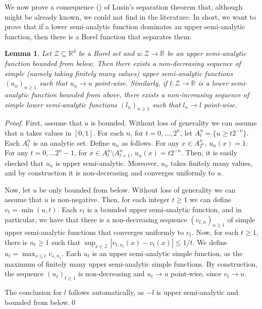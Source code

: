 \documentclass[3p, authoryear, 10pt]{elsarticle}%
\newcommand{\R}{\mathbb R}
\newcommand{\Z}{\mathcal Z}
\newtheorem{lemma}{Lemma}
\begin{document}
We now prove a consequence () of Lusin's separation theorem that, although might be already known, we could not find in the literature. In short, we want to prove that if a lower semi-analytic function dominates an upper semi-analytic function, then there is a Borel function that separates them. 
\begin{lemma}\label{lem:usa}
    Let $\Z\subseteq\R^d$ be a Borel set and $u:\Z\to\R$ be an upper semi-analytic function bounded from below. Then there exists a non-decreasing sequence of simple (namely taking finitely many values) upper semi-analytic functions $(u_n)_{n\geq 1}$ such that $u_n\to u$ point-wise. Similarly, if $l:\Z\to\R$ is a lower semi-analytic function bounded from above, there exists a non-increasing sequence of simple lower semi-analytic functions $(l_n)_{n\geq 1}$ such that $l_n\to l$ point-wise.
\end{lemma}
\begin{proof}
    First, assume that $u$ is bounded. Without loss of generality we can assume that $u$ takes values in $[0,1]$. For each $n$, for $t=0,\dots, 2^n$, let $A_t^n = \{u\geq t2^{-n}\}$. Each $A_t^n$ is an analytic set. Define $u_n$ as follows. For any $x\in A_{2^n}^n$, $u_n(x) = 1$. For any $t=0,\dots 2^n-1$, for $x\in A_t^n\setminus A_{t+1}^n$, $u_n(x) = t2^{-n}$. Then, it is easily checked that $u_n$ is upper semi-analytic. Moreover, $u_n$ takes finitely many values, and by construction it is non-decreasing and converges uniformly to $u$. 

    Now, let $u$ be only bounded from below. Without loss of generality we can assume that $u$ is non-negative. Then, for each integer $t\geq 1$ we can define $v_t = \min(u,t)$. Each $v_t$ is a bounded upper semi-analytic function, and in particular, we have that there is a non-decreasing sequence $(v_{t,n})_{n\geq 1}$ of simple upper semi-analytic functions that converges uniformly to $v_t$. Now, for each $t\geq 1$, there is $n_t\geq 1$ such that $\sup_{x\in\Z}|v_{t,n_t}(x)-v_t(x)|\leq 1/t$. We define $u_t = \max_{s\leq t} v_{s, n_s}$. Each $u_t$ is an upper semi-analytic simple function, as the maximum of finitely many upper semi-analytic simple functions. By construction, the sequence $(u_t)_{t\geq 1}$ is non-decreasing and $u_t\to u$ point-wise, since $v_t\to u$.

    The conclusion for $l$ follows automatically, as $-l$ is upper semi-analytic and bounded from below.\qed
\end{proof}
\end{document}
